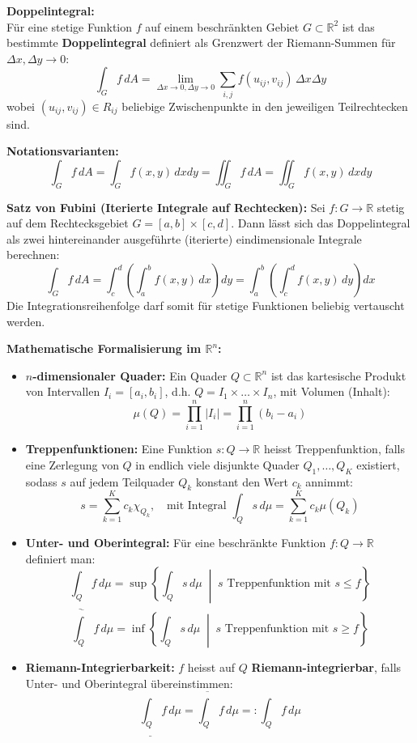 \begin{definition}
    \textbf{Doppelintegral:} \\
    Für eine stetige Funktion $f$ auf einem beschränkten Gebiet $G \subset \mathbb{R}^2$ ist das bestimmte \textbf{Doppelintegral} definiert als Grenzwert der Riemann-Summen für $\Delta x, \Delta y \to 0$:
    $$ \int_{G} f \, dA = \lim_{\Delta x \to 0, \Delta y \to 0} \sum_{i,j} f(u_{ij}, v_{ij}) \, \Delta x \Delta y $$
    wobei $(u_{ij}, v_{ij}) \in R_{ij}$ beliebige Zwischenpunkte in den jeweiligen Teilrechtecken sind.
    
    \textbf{Notationsvarianten:}
    $$ \int_{G} f \, dA = \int_{G} f(x,y) \, dx dy = \iint_{G} f \, dA = \iint_{G} f(x,y) \, dx dy $$
\end{definition}

\begin{theorem}
    \textbf{Satz von Fubini (Iterierte Integrale auf Rechtecken):}
    Sei $f: G \to \mathbb{R}$ stetig auf dem Rechtecksgebiet $G = [a,b] \times [c,d]$. Dann lässt sich das Doppelintegral als zwei hintereinander ausgeführte (iterierte) eindimensionale Integrale berechnen:
    $$ \int_{G} f \, dA = \int_{c}^{d} \left( \int_{a}^{b} f(x,y) \, dx \right) dy = \int_{a}^{b} \left( \int_{c}^{d} f(x,y) \, dy \right) dx $$
    Die Integrationsreihenfolge darf somit für stetige Funktionen beliebig vertauscht werden.
\end{theorem}

\begin{definition}
    \textbf{Mathematische Formalisierung im $\mathbb{R}^n$:}
    \begin{itemize}
        \item \textbf{$n$-dimensionaler Quader:} Ein Quader $Q \subset \mathbb{R}^n$ ist das kartesische Produkt von Intervallen $I_i = [a_i, b_i]$, d.h. $Q = I_1 \times \dots \times I_n$, mit Volumen (Inhalt):
        $$ \mu(Q) = \prod_{i=1}^{n} |I_i| = \prod_{i=1}^{n} (b_i - a_i) $$
        \item \textbf{Treppenfunktionen:} Eine Funktion $s: Q \to \mathbb{R}$ heisst Treppenfunktion, falls eine Zerlegung von $Q$ in endlich viele disjunkte Quader $Q_1, \dots, Q_K$ existiert, sodass $s$ auf jedem Teilquader $Q_k$ konstant den Wert $c_k$ annimmt:
        $$ s = \sum_{k=1}^K c_k \chi_{Q_k}, \quad \text{mit Integral } \int_Q s \, d\mu = \sum_{k=1}^K c_k \mu(Q_k) $$
        \item \textbf{Unter- und Oberintegral:} Für eine beschränkte Funktion $f: Q \to \mathbb{R}$ definiert man:
        $$ \underline{\int_Q} f \, d\mu = \sup \left\{ \int_Q s \, d\mu \;\middle|\; s \text{ Treppenfunktion mit } s \le f \right\} $$
        $$ \overline{\int_Q} f \, d\mu = \inf \left\{ \int_Q s \, d\mu \;\middle|\; s \text{ Treppenfunktion mit } s \ge f \right\} $$
        \item \textbf{Riemann-Integrierbarkeit:} $f$ heisst auf $Q$ \textbf{Riemann-integrierbar}, falls Unter- und Oberintegral übereinstimmen:
        $$ \underline{\int_Q} f \, d\mu = \overline{\int_Q} f \, d\mu =: \int_Q f \, d\mu $$
    \end{itemize}
\end{definition}

